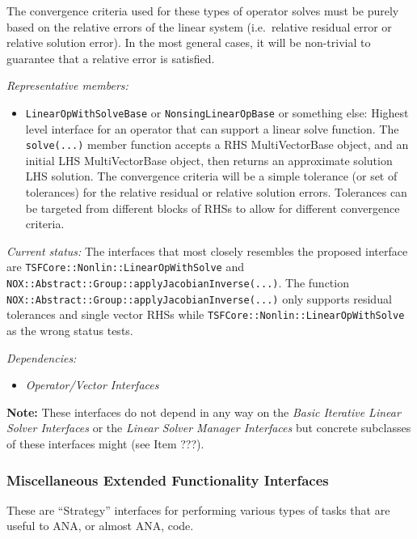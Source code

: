 \documentclass[pdf,ps2pdf,11pt]{SANDreport}
\begin{document}
The convergence criteria used for these types of operator solves must be
purely based on the relative errors of the linear system (i.e.\ relative
residual error or relative solution error).  In the most general cases, it
will be non-trivial to guarantee that a relative error is satisfied.

{}\textit{Representative members:}
\begin{itemize}
%
{}\item {}\texttt{LinearOpWithSolveBase} or {}\texttt{NonsingLinearOpBase} or
something else: Highest level interface for an operator that can support a
linear solve function.  The {}\texttt{solve(...)} member function accepts a
RHS MultiVectorBase object, and an initial LHS MultiVectorBase object, then
returns an approximate solution LHS solution.  The convergence criteria will
be a simple tolerance (or set of tolerances) for the relative residual or
relative solution errors.  Tolerances can be targeted from different blocks of
RHSs to allow for different convergence criteria.
%
\end{itemize}

{}\textit{Current status:} The interfaces that most closely resembles the
proposed interface are {}\texttt{TSFCore\-::Nonlin\-::Linear\-Op\-With\-Solve}
and {}\texttt{NOX\-::Abstract\-::Group\-::apply\-Jacobian\-Inverse(...)}.  The
function {}\texttt{NOX\-::Abstract\-::Group\-::apply\-Jacobian\-Inverse(...)} 
only supports residual tolerances and single vector RHSs while
{}\texttt{TSFCore\-::Nonlin\-::Linear\-Op\-With\-Solve} as the wrong status
tests.

{}\textit{Dependencies:}
\begin{itemize}
\item {}\textit{Operator/Vector Interfaces}
\end{itemize}

{}\textbf{Note:} These interfaces do not depend in any way on the
{}\textit{Basic Iterative Linear Solver Interfaces} or the {}\textit{Linear
Solver Manager Interfaces} but concrete subclasses of these interfaces might
(see Item ???).

%
\subsubsection{Miscellaneous Extended Functionality Interfaces}
%

These are ``Strategy'' interfaces for performing various types of tasks that
are useful to ANA, or almost ANA, code.
\end{document}
